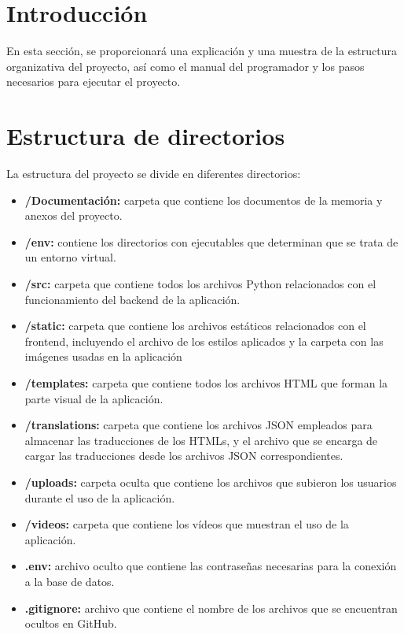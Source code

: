 
\section{Introducción}
En esta sección, se proporcionará una explicación y una muestra de la estructura organizativa del proyecto, así como el manual del programador y los pasos necesarios para ejecutar el proyecto.

\section{Estructura de directorios}
La estructura del proyecto se divide en diferentes directorios:

\begin{itemize}
    \item \textbf{/Documentación:} carpeta que contiene los documentos de la memoria y anexos del proyecto.
    \item \textbf{/env:} contiene los directorios con ejecutables que determinan que se trata de un entorno virtual.
    \item \textbf{/src:} carpeta que contiene todos los archivos Python relacionados con el funcionamiento del backend de la aplicación.
    \item \textbf{/static:} carpeta que contiene los archivos estáticos relacionados con el frontend, incluyendo el archivo de los estilos aplicados y la carpeta con las imágenes usadas en la aplicación
    \item \textbf{/templates:} carpeta que contiene todos los archivos HTML que forman la parte visual de la aplicación.
    \item \textbf{/translations:} carpeta que contiene los archivos JSON empleados para almacenar las traducciones de los HTMLs, y el archivo que se encarga de cargar las traducciones desde los archivos JSON correspondientes.
    \item \textbf{/uploads:} carpeta oculta que contiene los archivos que subieron los usuarios durante el uso de la aplicación.
    \item \textbf{/videos:} carpeta que contiene los vídeos que muestran el uso de la aplicación.
    \item \textbf{.env:} archivo oculto que contiene las contraseñas necesarias para la conexión a la base de datos.
    \item \textbf{.gitignore:} archivo que contiene el nombre de los archivos que se encuentran ocultos en GitHub.

\end{itemize}
